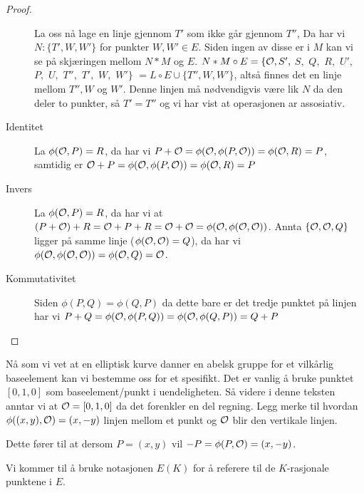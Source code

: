 \begin{teorem}
\begin{proof}
\begin{description}
La oss nå lage en linje gjennom $T'$ som ikke går gjennom $T''$, Da har vi $N: \{T', W, W'\}$ for punkter $W, W' \in E$. Siden ingen av disse er i $M$ kan vi se på skjæringen mellom $N*M$ og $E$. $N*M \circ E = \{\mathcal{O}, S',$ $ S, $ $ Q, $ $R, $ $U',$ $ P, $ $U, $ $T'',$ $ T',$ $ W,$ $ W'\}$ $ = L \circ E \cup \{T'', W, W' \}$, altså finnes det en linje mellom $T'', W$ og $ W'$. Denne linjen må nødvendigvis være lik $N$ da den deler to punkter, så $T' = T''$ og vi har vist at operasjonen ar assosiativ. \cite[5.6.4]{fulton}

\item[Identitet] La $\phi(\mathcal{O}, P) =R $, da har vi $P + \mathcal{O} = \phi(\mathcal{O}, \phi(P, \mathcal{O})) = \phi(\mathcal{O}, R) = P$, samtidig er $\mathcal{O} + P = \phi(\mathcal{O}, \phi(P, \mathcal{O})) = \phi(\mathcal{O}, R) = P$
\item[Invers] La $\phi(\mathcal{O}, P) = R$, da har vi at $(P + \mathcal{O}) + R = \mathcal{O} + P + R = \mathcal{O} + \mathcal{O} = \phi(\mathcal{O}, \phi(\mathcal{O}, \mathcal{O}))$. Annta $\{\mathcal{O}, \mathcal{O}, Q \}$ ligger på samme linje ($\phi(\mathcal{O}, \mathcal{O}) = Q$), da har vi $\phi(\mathcal{O}, \phi(\mathcal{O}, \mathcal{O})) = \phi(\mathcal{O}, Q) = \mathcal{O}$.
\item[Kommutativitet] Siden $\phi(P, Q) = \phi(Q,P)$ da dette bare er det tredje punktet på linjen har vi $P + Q = \phi(\mathcal{O}, \phi(P, Q)) = \phi(\mathcal{O}, \phi(Q,P)) = Q + P$
\end{description}
\end{proof}
\end{teorem}

Nå som vi vet at en elliptisk kurve danner en abelsk gruppe for et vilkårlig baseelement kan vi bestemme oss for et spesifikt. Det er vanlig å bruke punktet $[0,1,0]$ som baseelement/punkt i uendeligheten. Så videre i denne teksten anntar vi at $\mathcal{O} = [0,1,0]$ da det forenkler en del regning. Legg merke til hvordan $\phi((x,y), \mathcal{O}) = (x, -y)$ linjen mellom et punkt og $\mathcal{O}$ blir den vertikale linjen.

Dette fører til at dersom $P = (x,y)$ vil $-P = \phi(P, \mathcal{O}) = (x, -y)$.

Vi kommer til å bruke notasjonen $E(K)$ for å referere til de $K$-rasjonale punktene i $E$.



